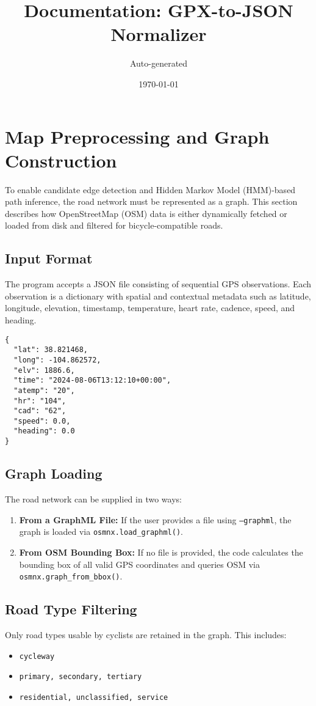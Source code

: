 \documentclass{article}
\title{Documentation: GPX-to-JSON Normalizer}
\author{Auto-generated}
\date{\today}
\begin{document}
\maketitle

\section{Map Preprocessing and Graph Construction}

To enable candidate edge detection and Hidden Markov Model (HMM)-based path inference, the road network must be represented as a graph. This section describes how OpenStreetMap (OSM) data is either dynamically fetched or loaded from disk and filtered for bicycle-compatible roads.

\subsection{Input Format}
The program accepts a JSON file consisting of sequential GPS observations. Each observation is a dictionary with spatial and contextual metadata such as latitude, longitude, elevation, timestamp, temperature, heart rate, cadence, speed, and heading.

\begin{lstlisting}
{
  "lat": 38.821468,
  "long": -104.862572,
  "elv": 1886.6,
  "time": "2024-08-06T13:12:10+00:00",
  "atemp": "20",
  "hr": "104",
  "cad": "62",
  "speed": 0.0,
  "heading": 0.0
}
\end{lstlisting}

\subsection{Graph Loading}
The road network can be supplied in two ways:

\begin{enumerate}
	\item \textbf{From a GraphML File:} If the user provides a file using \texttt{--graphml}, the graph is loaded via \texttt{osmnx.load\_graphml()}.
	\item \textbf{From OSM Bounding Box:} If no file is provided, the code calculates the bounding box of all valid GPS coordinates and queries OSM via \texttt{osmnx.graph\_from\_bbox()}.
\end{enumerate}

\subsection{Road Type Filtering}
Only road types usable by cyclists are retained in the graph. This includes:
\begin{itemize}
	\item \texttt{cycleway}
	\item \texttt{primary, secondary, tertiary}
	\item \texttt{residential, unclassified, service}
\end{itemize}
\end{document}
